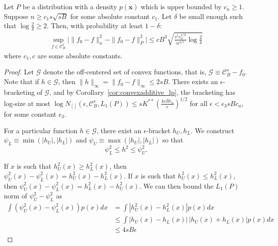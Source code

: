 \documentclass[12pt,pdftex,aos,noinfoline,addressasfootnote]{imsart}
\begin{document}
\begin{lemma}
\label{lem:uniform_convergence}
Let $P$ be a distribution with a density $p(\mathbf{x})$ which is upper bounded by $c_u \geq 1$. Suppose $n \geq c_1 s\sqrt{sB}$ for some absolute constant $c_1$. Let $\delta$ be small enough such that $\log \frac{2}{\delta} \geq 2$. Then, with probability at least $1-\delta$:
\begin{align*}
\sup_{f \in \mathcal{C}^s_B} \Big| \| f_0 - f \|^2_n - \|f_0 - f \|^2_P\Big| \leq
   c B^3 \sqrt{ \frac{s^5c_u^{1/2}}{n^{4/5}} \log \frac{2}{\delta}}
\end{align*}
where $c_1, c$ are some absolute constants.
\end{lemma}

\begin{proof}
Let $\mathcal{G}$ denote the off-centered set of convex functions, that is, $\mathcal{G} \equiv \mathcal{C}^s_B - f_0$. Note that if $h \in \mathcal{G}$, then $\| h \|_\infty = \| f_0 - f \|_\infty \leq 2 s B$.
There exists an $\epsilon$-bracketing of $\mathcal{G}$, and
by Corollary~\ref{cor:convexadditive_lp}, the bracketing has log-size at most $\log N_{[]}(\epsilon, \mathcal{C}^s_B, L_1(P)) \leq s K^{**}\left( \frac{4sBc_u}{\epsilon} \right)^{1/2}$ for all $\epsilon < \epsilon_3 s B c_u$, for some constant $\epsilon_3$. 

For a particular function $h \in \mathcal{G}$, there exist an $\epsilon$-bracket $h_U, h_L$. We construct $\psi_L \equiv \min( |h_U|, |h_L|)$ and $\psi_U \equiv \max( |h_U|, |h_L| )$ so that
\[
\psi_L^2 \leq h^2 \leq \psi_U^2.
\]

If $x$ is such that $h^2_U(x) \geq h^2_L(x)$, then $\psi_U^2(x) - \psi_L^2(x) = h^2_U(x) - h^2_L(x)$. If $x$ is such that $h^2_U(x) \leq h^2_L(x)$, then $\psi_U^2(x) - \psi_L^2(x) = h^2_L(x) - h_U^2(x)$. We can then bound the $L_1(P)$ norm of $\psi_U^2 - \psi_L^2$ as
\begin{align*}
\int (\psi_U^2(x) - \psi_L^2(x)) p(x)dx  &=  \int | h_U^2(x) - h_L^2(x)| p(x) dx \\
   &\leq \int | h_U(x) - h_L(x) | \, |h_U(x) + h_L(x)| p(x) dx \\
   &\leq 4sB \epsilon
\end{align*}


\end{proof}
\end{document}
